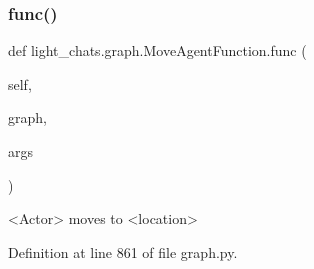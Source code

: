 \subsubsection{\texorpdfstring{func()}{func()}}
{\footnotesize\ttfamily def light\+\_\+chats.\+graph.\+Move\+Agent\+Function.\+func (\begin{DoxyParamCaption}\item[{}]{self,  }\item[{}]{graph,  }\item[{}]{args }\end{DoxyParamCaption})}

\begin{DoxyVerb}<Actor> moves to <location>
\end{DoxyVerb}
 

Definition at line 861 of file graph.\+py.


